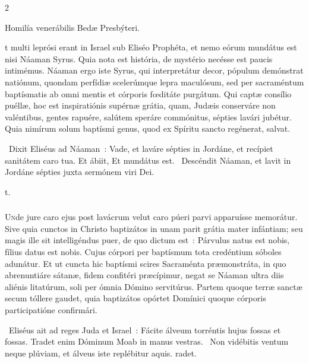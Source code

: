\documentclass[9pt,twoside]{extarticle}
\begin{document}
\begin{multicols}{2}
\begin{center}Homilía venerábilis Bedæ Presbýteri.\\
\end{center}
t multi leprósi erant in Israel sub Eliséo Prophéta, et nemo eórum mundátus est nisi Náaman Syrus. Quia nota est história, de mystério necésse est paucis intimémus. Náaman ergo iste Syrus, qui interpretátur decor, pópulum demónstrat natiónum, quondam perfídiæ scelerúmque lepra maculósum, sed per sacraméntum baptísmatis ab omni mentis et córporis fœditáte purgátum. Qui captæ consílio puéllæ, hoc est inspiratiónis supérnæ grátia, quam, Judæis conserváre non valéntibus, gentes rapuére, salútem speráre commónitus, sépties lavári jubétur. Quia nimírum solum baptísmi genus, quod ex Spíritu sancto regénerat, salvat.

\begin{tightlist}{}
\item {}~Dixit Eliséus ad Náaman~: Vade, et laváre sépties in Jordáne, et recípiet sanitátem caro tua. Et ábiit, \textred{*} Et mundátus est. ~Descéndit Náaman, et lavit in Jordáne sépties juxta sermónem viri Dei. \item {}t.
\end{tightlist}

\subsubsection*{\center {}}
\lettrine{U}nde jure caro ejus post lavácrum velut caro púeri parvi apparuísse memorátur. Sive quia cunctos in Christo baptizátos in unam parit grátia mater infántiam; seu magis ille sit intelligéndus puer, de quo dictum est~: Párvulus natus est nobis, fílius datus est nobis. Cujus córpori per baptísmum tota credéntium sóboles adunátur. Et ut cuncta hic baptísmi scires Sacraménta præmonstráta, in quo abrenuntiáre sátanæ, fidem confitéri præcípimur, negat se Náaman ultra diis aliénis litatúrum, soli per ómnia Dómino servitúrus. Partem quoque terræ sanctæ secum tóllere gaudet, quia baptizátos opórtet Domínici quoque córporis participatióne confirmári.

\begin{tightlist}{}
\item {}~Eliséus ait ad reges Juda et Israel~: Fácite álveum torréntis hujus fossas et fossas. \textred{*} Tradet enim Dóminum Moab in manus vestras. ~Non vidébitis ventum neque plúviam, et álveus iste replébitur aquis. radet.
\end{tightlist}


\end{multicols}
\end{document}
